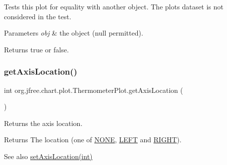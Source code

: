 Tests this plot for equality with another object. The plot\textquotesingle{}s dataset is not considered in the test.


\begin{DoxyParams}{Parameters}
{\em obj} & the object ({\ttfamily null} permitted).\\
\hline
\end{DoxyParams}
\begin{DoxyReturn}{Returns}
{\ttfamily true} or {\ttfamily false}. 
\end{DoxyReturn}
\mbox{\label{classorg_1_1jfree_1_1chart_1_1plot_1_1_thermometer_plot_a7d7e825ca604808c95356ca8859f849f}} 
\subsubsection{\texorpdfstring{get\+Axis\+Location()}{getAxisLocation()}}
{\footnotesize\ttfamily int org.\+jfree.\+chart.\+plot.\+Thermometer\+Plot.\+get\+Axis\+Location (\begin{DoxyParamCaption}{ }\end{DoxyParamCaption})}

Returns the axis location.

\begin{DoxyReturn}{Returns}
The location (one of \mbox{\hyperlink{classorg_1_1jfree_1_1chart_1_1plot_1_1_thermometer_plot_a5c5c2eaa1e5ec2630b9eb6e7735c4935}{N\+O\+NE}}, \mbox{\hyperlink{classorg_1_1jfree_1_1chart_1_1plot_1_1_thermometer_plot_aad7899a73457ebc2310a5df7d51c626a}{L\+E\+FT}} and \mbox{\hyperlink{classorg_1_1jfree_1_1chart_1_1plot_1_1_thermometer_plot_a2010a6ea7e1a8a5b523673d169b86a5d}{R\+I\+G\+HT}}).
\end{DoxyReturn}
\begin{DoxySeeAlso}{See also}
\mbox{\hyperlink{classorg_1_1jfree_1_1chart_1_1plot_1_1_thermometer_plot_a8d5206541bc648f7cc920b5183d38aa2}{set\+Axis\+Location(int)}} 
\end{DoxySeeAlso}
\mbox{\label{classorg_1_1jfree_1_1chart_1_1plot_1_1_thermometer_plot_a835baa52221fa566e1dfe2867aa220f4}} 
